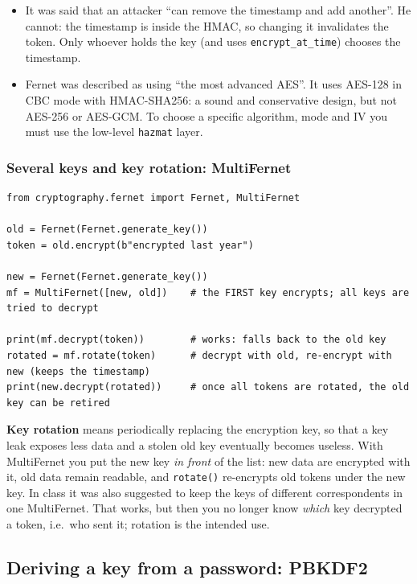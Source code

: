 \begin{remark}
\leavevmode
\begin{itemize}
    \item It was said that an attacker \enquote{can remove the timestamp and add another}. He cannot: the timestamp is inside the HMAC, so changing it invalidates the token. Only whoever holds the key (and uses \texttt{encrypt\_at\_time}) chooses the timestamp.
    \item Fernet was described as using \enquote{the most advanced AES}. It uses AES-128 in CBC mode with HMAC-SHA256: a sound and conservative design, but not AES-256 or AES-GCM. To choose a specific algorithm, mode and IV you must use the low-level \texttt{hazmat} layer.
\end{itemize}
\end{remark}

\subsubsection{Several keys and key rotation: MultiFernet}

\begin{verbatim}
from cryptography.fernet import Fernet, MultiFernet

old = Fernet(Fernet.generate_key())
token = old.encrypt(b"encrypted last year")

new = Fernet(Fernet.generate_key())
mf = MultiFernet([new, old])    # the FIRST key encrypts; all keys are tried to decrypt

print(mf.decrypt(token))        # works: falls back to the old key
rotated = mf.rotate(token)      # decrypt with old, re-encrypt with new (keeps the timestamp)
print(new.decrypt(rotated))     # once all tokens are rotated, the old key can be retired
\end{verbatim}

\textbf{Key rotation} means periodically replacing the encryption key, so that a key leak exposes less data and a stolen old key eventually becomes useless. With MultiFernet you put the new key \emph{in front} of the list: new data are encrypted with it, old data remain readable, and \texttt{rotate()} re-encrypts old tokens under the new key. In class it was also suggested to keep the keys of different correspondents in one MultiFernet. That works, but then you no longer know \emph{which} key decrypted a token, i.e.\ who sent it; rotation is the intended use.

\subsection{Deriving a key from a password: PBKDF2}

